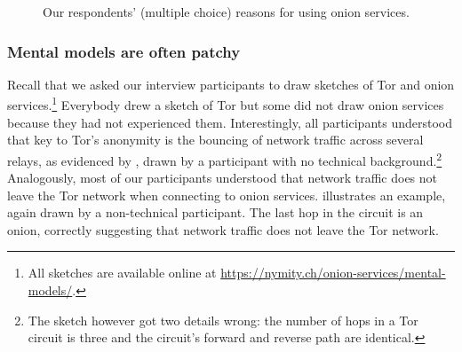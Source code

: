 \begin{figure}[t]
    \centering
    
    \caption{Our respondents' (multiple choice) reasons for using onion
    services.}
    \label{fig:onion-usage}
\end{figure}

\subsubsection{Mental models are often patchy}
\label{sec:mental-models}

Recall that we asked our interview participants to draw sketches of Tor and
onion services.\footnote{All sketches are available online at
\url{https://nymity.ch/onion-services/mental-models/}.}   Everybody drew a
sketch of Tor but some did not draw onion services because they had not
experienced them.  Interestingly, all participants understood that key to Tor's
anonymity is the bouncing of network traffic across several relays, as evidenced
by , drawn by a participant with no technical
background.\footnote{The sketch however got two details wrong: the number of
hops in a Tor circuit is three and the circuit's forward and reverse path are
identical.} Analogously, most of our participants understood that network
traffic does not leave the Tor network when connecting to onion services.
 illustrates an example, again drawn by a non-technical
participant.  The last hop in the circuit is an onion, correctly suggesting that
network traffic does not leave the Tor network.

